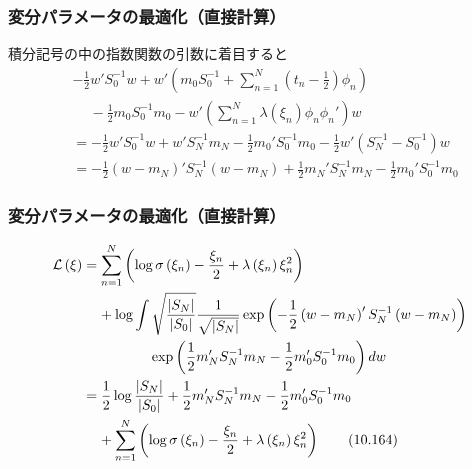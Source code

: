 \documentclass[10pt,usepdftitle=false,hyperref={unicode}]{beamer}
\newcommand{\absolute}[1]{\left|#1\right|}
\newcommand{\parentheses}[1]{\left(#1\right)}
\newcommand{\energy}{\mathcal{L}}
\begin{document}
\begin{frame}
\frametitle{変分パラメータの最適化（直接計算）}
積分記号の中の指数関数の引数に着目すると
\begin{align*}
    &-\frac{1}{2}w'S_0^{-1}w
    + w'\parentheses{%
        m_0S_0^{-1} +
        \sum_{n = 1}^N \parentheses{t_n - \frac{1}{2}}\phi_n
    }\\
    &\phantom{-}- \frac{1}{2}m_0S_0^{-1}m_0
    - w'\parentheses{\sum_{n = 1}^N \lambda\parentheses{\xi_n}\phi_n\phi_n'}w
    \\
    &=-\frac{1}{2}w'S_0^{-1}w
    + w'S_N^{-1}m_N
    - \frac{1}{2}m_0'S_0^{-1}m_0
    - \frac{1}{2}w'\parentheses{S_N^{-1} - S_0^{-1}}w \\
    &= -\frac{1}{2}\parentheses{w - m_N}'S_N^{-1}\parentheses{w - m_N}
    + \frac{1}{2}m_N'S_N^{-1}m_N - \frac{1}{2}m_0'S_0^{-1}m_0
\end{align*}
\end{frame}

\begin{frame}
\frametitle{変分パラメータの最適化（直接計算）}
\begin{align}
    \energy\parentheses{\xi}
    &= \sum_{n = 1}^N
        \parentheses{%
            \log\sigma\parentheses{\xi_n}
            - \frac{\xi_n}{2}
            + \lambda\parentheses{\xi_n}\xi_n^2
        } \notag \\
    &\phantom{=}\ + \log \int \sqrt{\frac{\absolute{S_N}}{\absolute{S_0}}}\frac{1}{\sqrt{\absolute{S_N}}}\exp\parentheses{-\frac{1}{2}\parentheses{w - m_N}'S_N^{-1}\parentheses{w - m_N}} \notag \\
    &\phantom{=+\log\int}\ \exp\parentheses{\frac{1}{2}m_N'S_N^{-1}m_N - \frac{1}{2}m_0'S_0^{-1}m_0} dw \notag \\
    &= \frac{1}{2}\log\frac{\absolute{S_N}}{\absolute{S_0}}
        + \frac{1}{2}m_N'S_N^{-1}m_N - \frac{1}{2}m_0'S_0^{-1}m_0 \notag \\
    &\phantom{=}\ + \sum_{n = 1}^N
        \parentheses{%
            \log\sigma\parentheses{\xi_n}
            - \frac{\xi_n}{2}
            + \lambda\parentheses{\xi_n}\xi_n^2
        } \tag{10.164} \label{lxi}
\end{align}
\end{frame}
\end{document}
